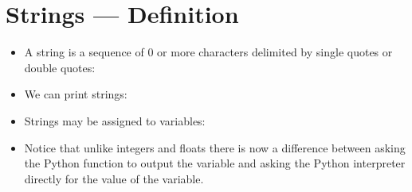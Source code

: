 \documentclass[letterpaper,10pt,english]{sphinxmanual}
\begin{document}
\section{Strings — Definition}
\label{\detokenize{lecture_notes/lec03_strings:strings-definition}}\begin{itemize}
\item {} 
A string is a sequence of 0 or more characters delimited by single
quotes or double quotes:

\begin{sphinxVerbatim}[commandchars=\\\{\}]
\end{sphinxVerbatim}

\item {} 
We can print strings:

\begin{sphinxVerbatim}[commandchars=\\\{\}]
\end{sphinxVerbatim}

\item {} 
Strings may be assigned to variables:

\begin{sphinxVerbatim}[commandchars=\\\{\}]
  
  
\end{sphinxVerbatim}

\item {} 
Notice that unlike integers and floats there is now a difference
between asking the Python function  to output the variable
and asking the Python interpreter directly for the value of the
variable.

\end{itemize}
\end{document}
